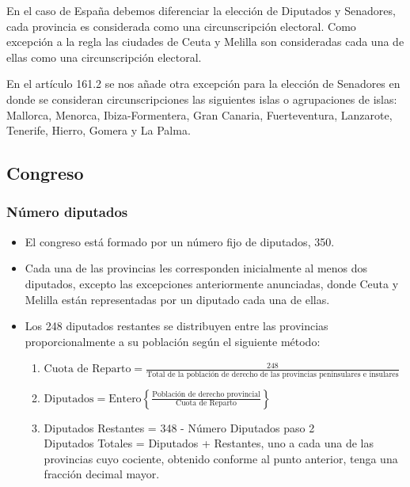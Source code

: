 \documentclass[12pt,a4paper,]{book}
\numberwithin{dummy}{section}
\theoremstyle{ocrenumbox}
\theoremstyle{blacknumex}
\theoremstyle{blacknumbox}
\theoremstyle{ocrenum}
\theoremstyle{ocrenum}
\begin{document}
En el caso de España debemos diferenciar la elección de Diputados y
Senadores, cada provincia es considerada como una circunscripción
electoral. Como excepción a la regla las ciudades de Ceuta y Melilla son
consideradas cada una de ellas como una circunscripción electoral.

En el artículo 161.2 se nos añade otra excepción para la elección de
Senadores en donde se consideran circunscripciones las siguientes islas
o agrupaciones de islas: Mallorca, Menorca, Ibiza-Formentera, Gran
Canaria, Fuerteventura, Lanzarote, Tenerife, Hierro, Gomera y La Palma.

\hypertarget{congreso}{%
\subsection{Congreso}\label{congreso}}

\hypertarget{nuxfamero-diputados}{%
\subsubsection{Número diputados}\label{nuxfamero-diputados}}

\begin{itemize}
\item
  El congreso está formado por un número fijo de diputados, 350.
\item
  Cada una de las provincias les corresponden inicialmente al menos dos
  diputados, excepto las excepciones anteriormente anunciadas, donde
  Ceuta y Melilla están representadas por un diputado cada una de ellas.
\item
  Los 248 diputados restantes se distribuyen entre las provincias
  proporcionalmente a su población según el siguiente método:

  \begin{enumerate}
  \def\labelenumi{\arabic{enumi}.}
  \item
    \(\textrm{Cuota de Reparto} = \frac{248}{\text{Total de la poblaci\'{o}n de derecho de las provincias peninsulares e insulares}}\)
  \item
    \(\textrm{Diputados} = \text{Entero} \left\{\frac{\text{Población de derecho provincial}}{\text{Cuota de Reparto}}\right\}\)
  \item
    Diputados Restantes = 348 - Número Diputados paso 2\\
    Diputados Totales = Diputados + Restantes, uno a cada una de las
    provincias cuyo cociente, obtenido conforme al punto anterior, tenga
    una fracción decimal mayor.
  \end{enumerate}
\end{itemize}
\end{document}
